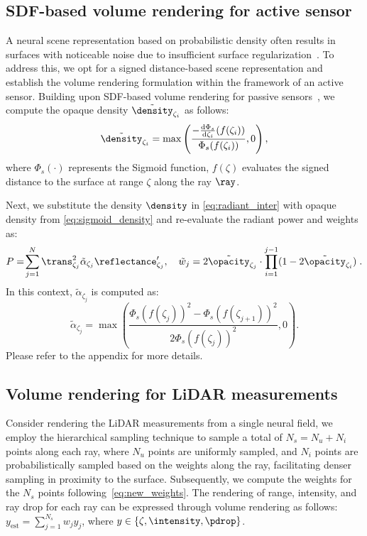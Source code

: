 \subsection{SDF-based volume rendering for active sensor} 
\label{sec:sdf_vol_render}
A neural scene representation based on probabilistic density often results in surfaces with noticeable noise due to insufficient surface regularization~\cite{wang2021neus}. To address this, we opt for a signed distance-based scene representation and establish the volume rendering formulation within the framework of an active sensor. Building upon SDF-based volume rendering for passive sensors~\cite{wang2021neus}, we compute the opaque density $\tilde{\density}_{\zeta_i}$ as follows:
\begin{equation}
\tilde{\density}_{\zeta_i} = \max\left(\frac{-\frac{{\textrm{d}}\Phi_s}{{\textrm{d}} \zeta_i}(f(\zeta_i))}{\Phi_s(f(\zeta_i))},0\right),
\label{eq:sigmoid_density}
\end{equation}
where $\Phi_s(\cdot)$ represents the Sigmoid function, $f(\zeta)$ evaluates the signed distance to the surface at range $\zeta$ along the ray $\ray$. 

Next, we substitute the density $\density$ in \cref{eq:radiant_inter} with opaque density from \cref{eq:sigmoid_density} and re-evaluate the radiant power and weights as:
\begin{equation}
      P
      =\!\sum_{j=1}^N \trans^2_{\zeta_j} \tilde{\alpha}_{\zeta_j} \reflectance_{\zeta_j}',\quad \tilde{w}_j = 2 \tilde{\opacity}_{\zeta_j} \cdot\prod_{i=1}^{j-1}(1 - 2 \tilde{\opacity}_{\zeta_i})\;.
\end{equation}
In this context, $\tilde{\alpha}_{\zeta_j}$ is computed as:
\begin{equation}
    \tilde{\alpha}_{\zeta_j} = \max\left(\!\frac{{\Phi_s(f(\zeta_j))}^2 -{\Phi_s(f(\zeta_{j+1}))}^2}{{2\Phi_s(f(\zeta_j))}^2},0\right).
    \label{eq:new_weights}
\end{equation}
Please refer to the appendix for more details.


\subsection{Volume rendering for LiDAR measurements}
\label{sec:dynamic_nfl_rendering}
Consider rendering the LiDAR measurements from a single neural field, we employ the hierarchical sampling\cite{wang2021neus} technique to sample a total of $N_s= N_u + N_i$ points along each ray, where $N_u$ points are uniformly sampled, and $N_i$ points are probabilistically sampled based on the weights along the ray, facilitating denser sampling in proximity to the surface. Subsequently, we compute the weights for the $N_s$ points following~\cref{eq:new_weights}. The rendering of range, intensity, and ray drop for each ray can be expressed through volume rendering as follows: $y_\text{est} = \sum_{j=1}^{N_s} w_j y_j$, where $y \in \{\zeta, \intensity, \pdrop\}$.


